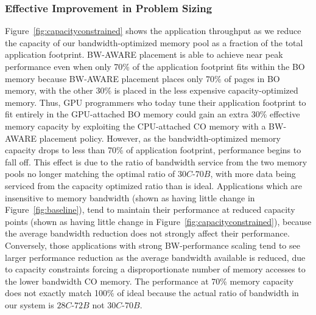 \subsubsection{Effective Improvement in Problem Sizing\\}
Figure~\ref{fig:capacityconstrained} shows the application throughput as we reduce the 
capacity of our bandwidth-optimized memory pool as a fraction of the total application footprint. 
BW-AWARE placement is able to
achieve near peak performance even when only 70\% of the application footprint
fits within the BO memory because BW-AWARE placement places only 70\% of pages in BO memory, with the other 30\% 
is placed in the less expensive capacity-optimized memory.
Thus, GPU programmers who today tune their application footprint to fit entirely in the GPU-attached BO memory could
gain an extra 30\% effective memory capacity by exploiting the CPU-attached CO memory with a BW-AWARE
placement policy.
However, as the bandwidth-optimized memory capacity drops to less than 70\% of application footprint,
performance begins to fall off. This effect is due to the ratio of bandwidth service from the two memory
pools no longer matching the optimal ratio of $30C$-$70B$, with more data being serviced from the capacity
optimized ratio than is ideal. {\color{black}Applications which are insensitive to memory bandwidth 
(shown as having little change in Figure~\ref{fig:baseline}), tend to maintain their performance at reduced capacity points 
(shown as having little change in Figure~\ref{fig:capacityconstrained}), because the average bandwidth reduction does not strongly affect
their performance.  Conversely, those applications with strong BW-performance scaling tend to see larger performance 
reduction as the average bandwidth available is reduced, due to capacity constraints forcing a disproportionate
number of memory accesses to the lower bandwidth CO memory.}
The performance at 70\% memory capacity does not exactly
match 100\% of ideal because the actual ratio of bandwidth in our system is
$28C$-$72B$ not $30C$-$70B$.


